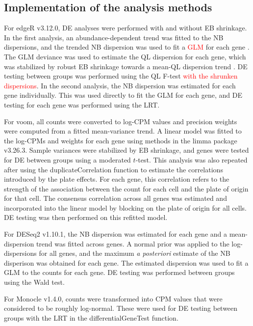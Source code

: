\documentclass{article}
\newcommand\revised[1]{\textcolor{red}{#1}}
\begin{document}
\subsection{Implementation of the analysis methods}
For edgeR v3.12.0, DE analyses were performed with and without EB shrinkage.
In the first analysis, an abundance-dependent trend was fitted to the NB dispersions, and the trended NB dispersion was used to fit a \revised{GLM} for each gene \citep{mccarthy2012differential}.
The GLM deviance was used to estimate the QL dispersion for each gene, which was stabilized by robust EB shrinkage towards a mean-QL dispersion trend \citep{lund2012detecting}.
DE testing between groups was performed using the QL F-test \revised{with the shrunken dispersions}.
In the second analysis, the NB dispersion was estimated for each gene individually.
This was used directly to fit the GLM for each gene, and DE testing for each gene was performed using the LRT.

For voom, all counts were converted to log-CPM values and precision weights were computed from a fitted mean-variance trend.
A linear model was fitted to the log-CPMs and weights for each gene using methods in the limma package v3.26.3.
Sample variances were stabilized by EB shrinkage, and genes were tested for DE between groups using a moderated $t$-test.
This analysis was also repeated after using the duplicateCorrelation function \citep{smyth2005use} to estimate the correlations introduced by the plate effects.
For each gene, this correlation refers to the strength of the association between the count for each cell and the plate of origin for that cell.
The consensus correlation across all genes was estimated and incorporated into the linear model by blocking on the plate of origin for all cells.
DE testing was then performed on this refitted model.

For DESeq2 v1.10.1, the NB dispersion was estimated for each gene and a mean-dispersion trend was fitted across genes.
A normal prior was applied to the log-dispersions for all genes, and the maximum \textit{a posteriori} estimate of the NB disperison was obtained for each gene.
The estimated dispersion was used to fit a GLM to the counts for each gene.
DE testing was performed between groups using the Wald test.

For Monocle v1.4.0, counts were transformed into CPM values that were considered to be roughly log-normal.
These were used for DE testing between groups with the LRT in the differentialGeneTest function.
\end{document}
